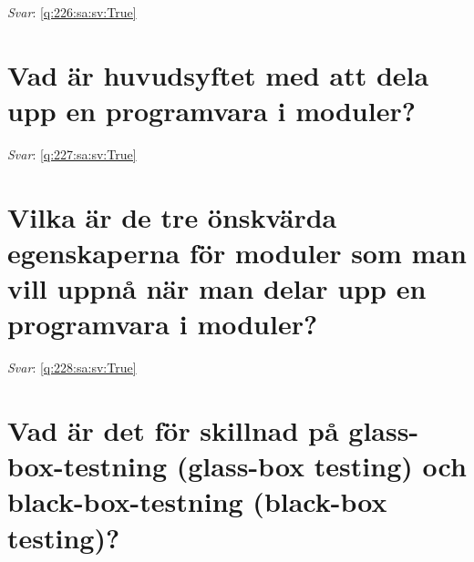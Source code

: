 \documentclass[a4paper,11pt,oneside]{book}
\begin{document}
\begin{sloppypar}
\label{q:226:sa:sv:False}

\vspace{2cm}

\noindent\makebox[\textwidth]{\hrulefill}

\vspace{1cm}

\textit{Svar}: \autoref{q:226:sa:sv:True}



\section{Vad \"ar huvudsyftet med att dela upp en programvara i moduler?}

\label{q:227:sa:sv:False}

\vspace{2cm}

\noindent\makebox[\textwidth]{\hrulefill}

\vspace{1cm}

\textit{Svar}: \autoref{q:227:sa:sv:True}



\section{Vilka \"ar de tre \"onskv\"arda egenskaperna f\"or moduler som man vill uppn\r{a} n\"ar man delar upp en programvara i moduler?}

\label{q:228:sa:sv:False}

\vspace{2cm}

\noindent\makebox[\textwidth]{\hrulefill}

\vspace{1cm}

\textit{Svar}: \autoref{q:228:sa:sv:True}



\section{Vad \"ar det f\"or skillnad p\r{a} glass-box-testning (glass-box testing) och black-box-testning (black-box testing)?}

\label{q:229:sa:sv:False}

\vspace{2cm}

\noindent\makebox[\textwidth]{\hrulefill}

\vspace{1cm}


\end{sloppypar}
\end{document}

